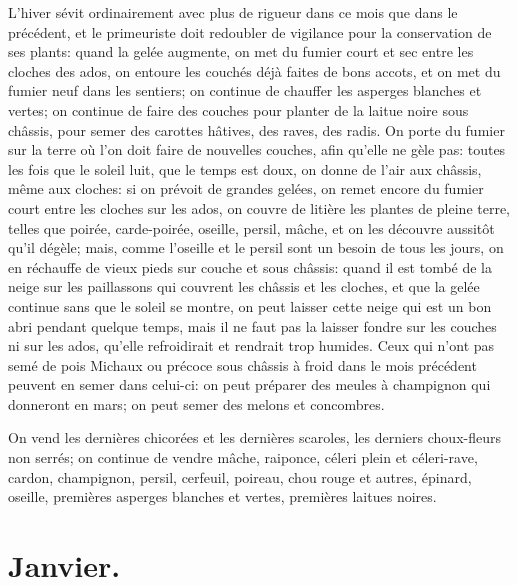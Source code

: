 \documentclass[10pt,a4paper]{book}
\begin{document}
L'hiver sévit ordinairement avec plus de rigueur dans ce mois que dans le précédent, et le primeuriste doit redoubler de vigilance pour la conservation de ses plants: quand la gelée augmente, on met du fumier court et sec entre les cloches des ados, on entoure les couchés déjà faites de bons accots, et on met du fumier neuf dans les sentiers; on continue de chauffer les asperges blanches et vertes; on continue de faire des couches pour planter de la laitue noire sous châssis, pour semer des carottes hâtives, des raves, des radis. On porte du fumier sur la terre où l'on doit faire de nouvelles couches, afin qu'elle ne gèle pas: toutes les fois que le soleil luit, que le temps est doux, on donne de l'air aux châssis, même aux cloches: si on prévoit de grandes gelées, on remet encore du fumier court entre les cloches sur les ados, on couvre de litière les plantes de pleine terre, telles que poirée, carde-poirée, oseille, persil, mâche, et on les découvre aussitôt qu'il dégèle; mais, comme l'oseille et le persil sont un besoin de tous les jours, on en réchauffe de vieux pieds sur couche et sous châssis: quand il est tombé de la neige sur les paillassons qui couvrent les châssis et les cloches, et que la gelée continue sans que le soleil se montre, on peut laisser cette neige qui est un bon abri pendant quelque temps, mais il ne faut pas la laisser fondre sur les couches ni sur les ados, qu'elle refroidirait et rendrait trop humides. Ceux qui n'ont pas semé de pois Michaux ou précoce sous châssis à froid dans le mois précédent peuvent en semer dans celui-ci: on peut préparer des meules à champignon qui donneront en mars; on peut semer des melons et concombres.

On vend les dernières chicorées et les dernières scaroles, les derniers choux-fleurs non serrés; on continue de vendre mâche, raiponce, céleri plein et céleri-rave, cardon, champignon, persil, cerfeuil, poireau, chou rouge et autres, épinard, oseille, premières asperges blanches et vertes, premières laitues noires.

\section{Janvier.}
\end{document}
